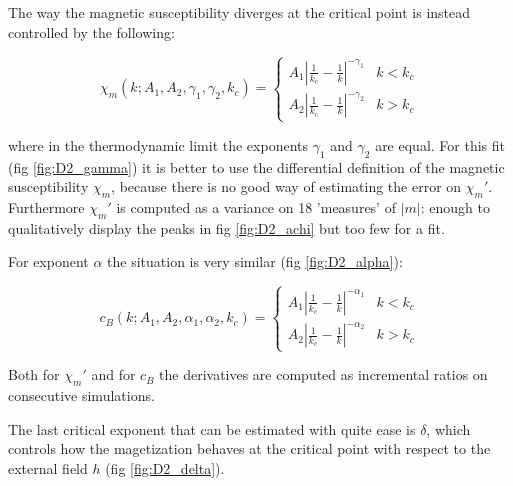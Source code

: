 \documentclass[a4paper, 11pt]{article}
\begin{document}
      The way the magnetic susceptibility diverges at the critical point is instead controlled by the following:

      \begin{equation}
        \chi_m(k;A_1,A_2,\gamma_1,\gamma_2,k_c) = \begin{cases}
          A_1 \left|\frac{1}{k_c} - \frac{1}{k} \right|^{-\gamma_1} & k < k_c \\
          A_2 \left|\frac{1}{k_c} - \frac{1}{k} \right|^{-\gamma_2} & k > k_c
        \end{cases}
      \end{equation}

      where in the thermodynamic limit the exponents $\gamma_1$ and $\gamma_2$ are equal.
      For this fit (fig \ref{fig:D2_gamma}) it is better to use the differential definition of the magnetic susceptibility $\chi_m$, because there is no good way of estimating the error on $\chi_m'$. Furthermore $\chi_m'$ is computed as a variance on 18 'measures' of $|m|$: enough to qualitatively display the peaks in fig \ref{fig:D2_achi} but too few for a fit.


      For exponent $\alpha$ the situation is very similar (fig \ref{fig:D2_alpha}):

      \begin{equation}
        c_B(k;A_1,A_2,\alpha_1,\alpha_2,k_c) = \begin{cases}
          A_1 \left|\frac{1}{k_c} - \frac{1}{k} \right|^{-\alpha_1} & k < k_c \\
          A_2 \left|\frac{1}{k_c} - \frac{1}{k} \right|^{-\alpha_2} & k > k_c
        \end{cases}
      \end{equation}

      Both for $\chi_m'$ and for $c_B$ the derivatives are computed as incremental ratios on consecutive simulations.

      The last critical exponent that can be estimated with quite ease is $\delta$, which controls how the magetization behaves at the critical point with respect to the external field $h$ (fig \ref{fig:D2_delta}).
\end{document}
